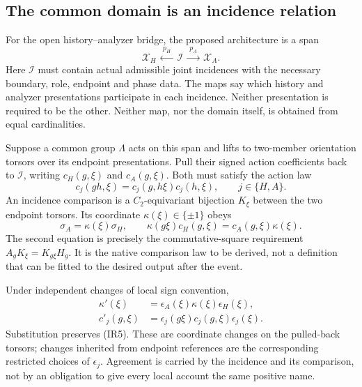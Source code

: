 \subsection*{The common domain is an incidence relation}
For the open history--analyzer bridge, the proposed architecture is a span
\begin{equation}
\mathcal X_H\ \xleftarrow{\ p_H\ }\ \mathcal I\
\xrightarrow{\ p_A\ }\ \mathcal X_A.
\tag{IR4}\label{eq:incidencespan}
\end{equation}
Here $\mathcal I$ must contain actual admissible joint incidences with the necessary boundary, role, endpoint and phase data. The maps say which history and analyzer presentations participate in each incidence. Neither presentation is required to be the other. Neither map, nor the domain itself, is obtained from equal cardinalities.

Suppose a common group $\Lambda$ acts on this span and lifts to two-member orientation torsors over its endpoint presentations. Pull their signed action coefficients back to $\mathcal I$, writing $c_H(g,\xi)$ and $c_A(g,\xi)$. Both must satisfy the action law
\[
c_j(gh,\xi)=c_j(g,h\xi)c_j(h,\xi),\qquad j\in\{H,A\}.
\]
An incidence comparison is a $C_2$-equivariant bijection $K_\xi$ between the two endpoint torsors. Its coordinate $\kappa(\xi)\in\{\pm1\}$ obeys
\begin{equation}
\sigma_A=\kappa(\xi)\sigma_H,\qquad
\kappa(g\xi)c_H(g,\xi)=c_A(g,\xi)\kappa(\xi).
\tag{IR5}\label{eq:comparisonnaturality}
\end{equation}
The second equation is precisely the commutative-square requirement
$A_gK_\xi=K_{g\xi}H_g$. It is the native comparison law to be derived, not a definition that can be fitted to the desired output after the event.

Under independent changes of local sign convention,
\begin{equation}
\begin{aligned}
\kappa'(\xi)&=\epsilon_A(\xi)\kappa(\xi)\epsilon_H(\xi),\\
c'_j(g,\xi)&=\epsilon_j(g\xi)c_j(g,\xi)\epsilon_j(\xi).
\end{aligned}
\tag{IR6}\label{eq:comparisongauge}
\end{equation}
Substitution preserves (IR5). These are coordinate changes on the pulled-back torsors; changes inherited from endpoint references are the corresponding restricted choices of $\epsilon_j$. Agreement is carried by the incidence and its comparison, not by an obligation to give every local account the same positive name.

